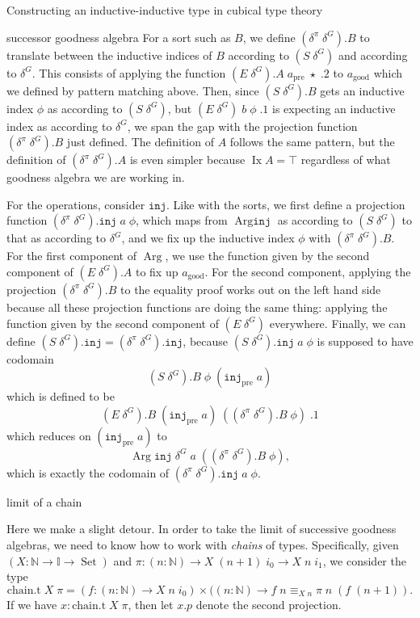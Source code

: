 \documentclass[acmsmall,review]{acmart}\settopmatter{printfolios=true,printccs=false,printacmref=false}
\DeclareMathOperator{\USet}{Set}
\DeclareMathOperator{\Arg}{Arg}
\DeclareMathOperator{\Ix}{Ix}
\newcommand{\pre}[1]{{#1}_\text{pre}}
\newcommand{\good}[1]{{#1}_\text{good}}
\newcommand{\IdA}[3]{{#1}\equiv_{#3}{#2}}
\newcommand{\N}{\mathbb{N}}
\newcommand{\I}{\mathbb{I}}
\newcommand{\inj}{\texttt{inj}}
\begin{document}
\begin{section}{Constructing an inductive-inductive type in cubical type theory}
\begin{subsection}{successor goodness algebra}
For a sort such as $B$, we define $(\delta^\pi\;\delta^G).B$ to translate between the inductive indices of $B$ according to $(S\;\delta^G)$ and according to $\delta^G$. This consists of applying the function $(E\;\delta^G).A\;\pre{a}\;\star\;.2$ to $\good{a}$ which we defined by pattern matching above. Then, since $(S\;\delta^G).B$ gets an inductive index $\phi$ as according to $(S\;\delta^G)$, but $(E\;\delta^G)\;b\;\phi\;.1$ is expecting an inductive index as according to $\delta^G$, we span the gap with the projection function $(\delta^\pi\;\delta^G).B$ just defined. The definition of $A$ follows the same pattern, but the definition of $(\delta^\pi\;\delta^G).A$ is even simpler because $\Ix A = \top$ regardless of what goodness algebra we are working in.

For the operations, consider $\inj$. Like with the sorts, we first define a projection function $(\delta^\pi\;\delta^G).\inj\;a\;\phi$, which maps from $\Arg\inj$ as according to $(S\;\delta^G)$ to that as according to $\delta^G$, and we fix up the inductive index $\phi$ with $(\delta^\pi\;\delta^G).B$. For the first component of $\Arg$, we use the function given by the second component of $(E\;\delta^G).A$ to fix up $\good{a}$. For the second component, applying the projection $(\delta^\pi\;\delta^G).B$ to the equality proof works out on the left hand side because all these projection functions are doing the same thing: applying the function given by the second component of $(E\;\delta^G)$ everywhere. Finally, we can define $(S\;\delta^G).\inj = (\delta^\pi\;\delta^G).\inj$, because $(S\;\delta^G).\inj\;a\;\phi$ is supposed to have codomain \[(S\;\delta^G).B\;\phi\;(\pre{\inj}\;a)\] which is defined to be \[(E\;\delta^G).B\;(\pre{\inj}\;a)\;((\delta^\pi\;\delta^G).B\;\phi)\;.1\] which reduces on $(\pre{\inj}\;a)$ to \[\Arg\inj\;\delta^G\;a\;((\delta^\pi\;\delta^G).B\;\phi),\] which is exactly the codomain of $(\delta^\pi\;\delta^G).\inj\;a\;\phi$.

\end{subsection}

\begin{subsection}{limit of a chain}\label{ex-chain}

Here we make a slight detour. In order to take the limit of successive goodness algebras, we need to know how to work with \emph{chains} of types. Specifically, given $(X : \N \to \I \to \USet)$ and $\pi : (n : \N) \to X\;(n+1)\;i_0 \to X\;n\;i_1$, we consider the type \[\text{chain.t}\;X\;\pi = (f : (n : \N) \to X\;n\;i_0)\times((n : \N) \to \IdA{f\;n}{\pi\;n\;(f\;(n+1))}{X\;n}.\] If we have $x : \text{chain.t}\;X\;\pi$, then let $x.p$ denote the second projection.


\end{subsection}
\end{section}
\end{document}
